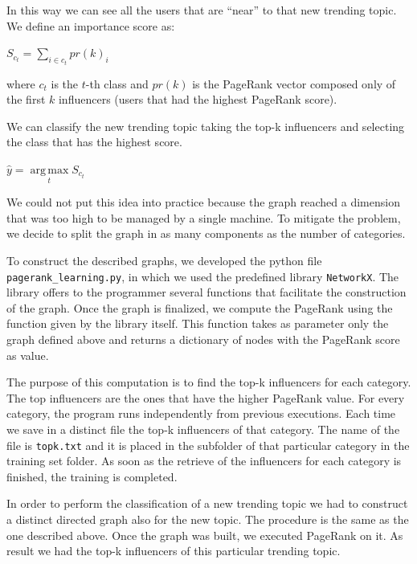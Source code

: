 \documentclass[journal,11pt]{vgtc}
\DeclareMathOperator*{\argmax}{arg\,max}
\begin{document}
\bigskip

In this way we can see all the users that are ``near'' to that new trending topic.
We define an importance score as:

\medskip

\begin{center}
$
S_{c_t}=\sum\limits_{i \in c_t} pr(k)_i
$
\end{center}

\medskip

where $c_t$ is the $t$-th class and $pr(k)$ is the PageRank vector composed only of the first $k$ influencers
(users that had the highest PageRank score).

We can classify the new trending topic taking the top-k influencers and selecting the class that has the highest score.

\medskip

\begin{center}
$
\hat{y}=\argmax\limits_{t} S_{c_t}
$
\end{center}

\medskip

We could not put this idea into practice because the graph reached a dimension that was too high
to be managed by a single machine.
To mitigate the problem, we decide to split the graph in as many components as the number of categories.

To construct the described graphs, we developed the python file \texttt{pagerank\_learning.py},
in which we used the predefined library \texttt{NetworkX}.
The library offers to the programmer several functions that facilitate the construction of the graph.
Once the graph is finalized, we compute the PageRank using the function given by the library itself.
This function takes as parameter only the graph defined above and returns a dictionary of nodes
with the PageRank score as value.

The purpose of this computation is to find the top-k influencers for each category. The top influencers
are the ones that have the higher PageRank value.
For every category, the program runs independently from previous executions. Each time we save in a
distinct file the top-k influencers of that category. The name of the file is
\texttt{topk.txt} and it is placed in the subfolder of that particular category in the training set folder.
As soon as the retrieve of the influencers for each category is finished, the training is completed.

In order to perform the classification of a new trending topic we had to construct a distinct directed graph
also for the new topic. The procedure is the same as the one described above.
Once the graph was built, we executed PageRank on it.
As result we had the top-k influencers of this particular trending topic.
\end{document}
